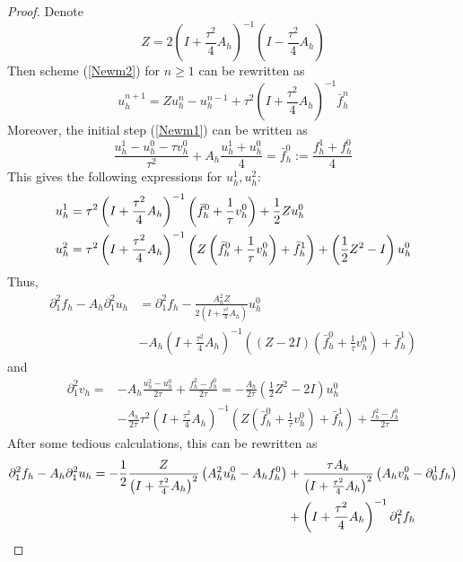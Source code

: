 \documentclass{imanum}
\begin{document}
\begin{proof} Denote
\[ Z = 2 \left( I + \frac{\tau^2}{4} A_h \right)^{- 1} \left( I -
   \frac{\tau^2}{4} A_h \right) \]
Then scheme (\ref{Newm2}) for $n \geq 1$ can be rewritten as
\[ u^{n + 1}_h = Zu_h^n - u^{n - 1}_h + \tau^2 \left( I + \frac{\tau^2}{4} A_h
   \right)^{- 1} \bar{f}^n_h \]
Moreover, the initial step (\ref{Newm1}) can be written as
\begin{equation*}
  \frac{u^1_h - u^0_h - \tau v^0_h}{\tau^2} + A_h ^{} \frac{u^1_h + u^0_h}{4}
  = \bar{f}^0_h := \frac{f^1_h + f^0_h}{4} \label{Newmh0}
\end{equation*}
This gives the following expressions for $u_h^1, u_h^2$:
\begin{align*}
\notag u_h^1 &= \tau^2 \left( I + \frac{\tau^2}{4} A_h \right)^{- 1} \left(
   \bar{f}^0_h + \frac{1}{\tau} v^0_h \right) + \frac{1}{2} Zu^0_h \\
\notag u_h^2 &= \tau^2 \left( I + \frac{\tau^2}{4} A_h \right)^{- 1} \left( Z
   \left( \bar{f}^0_h + \frac{1}{\tau} v^0_h \right) + \bar{f}^1_h \right) +
   \left( \frac{1}{2} Z^2_{} - I \right) u_h^0 
\end{align*}
Thus,
\begin{align*}
 \partial^{2}_1f_h-A_h\partial^{2}_1 u_h &=   \partial^{2}_1f_h - \frac{A^2_hZ}{2\left(I + \frac{\tau^2}{4} A_h \right)}u^0_h \\
 &- {A_h}\left( I + \frac{\tau^2}{4} A_h \right)^{- 1} \left( (Z-2I)
   \left( \bar{f}^0_h + \frac{1}{\tau} v^0_h \right) + \bar{f}^1_h \right)
\end{align*}
and
\begin{align*}
 {\partial}^2_1 v_h = &-A_h\frac{u^2_h-u^0_h}{2\tau}+\frac{f^2_h-f^0_h}{2\tau}=-\frac{A_h}{2 \tau} \left(\frac{1}{2}Z^2 - 2 I\right) u^0_h \\
   &-   \frac{A_h}{2 \tau} \tau^2 \left( I + \frac{\tau^2}{4} A_h \right)^{- 1} \left( Z
   \left( \bar{f}^0_h + \frac{1}{\tau} v^0_h \right) + \bar{f}^1_h \right) +\frac{f^2_h-f^0_h}{2\tau} 
\end{align*} 
After some tedious calculations,  this can be rewritten as
\begin{align}
\notag \partial^{2}_1f_h-A_h\partial^{2}_1 u_h  =  -\frac{1}{2}  \frac{Z} {\left( I +
  \frac{\tau^2}{4} A_h \right)^2}  \left(A_h^2 u^0_h - A_h f^0_h\right) &+\frac{\tau A_h
  }{\left( I + \frac{\tau^2}{4} A_h \right)^2}  \left(A_h v^0_h - \partial^1_0 f_h\right)\\
 &+\left( I + \frac{\tau^2}{4} A_h \right)^{- 1}\partial^2_1 {f}_h 
  \label{expAhd2u} 

\end{align}
\end{proof}
\end{document}
